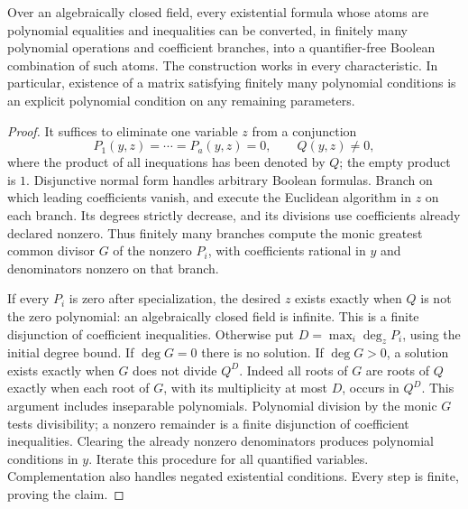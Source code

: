 \begin{lemma}
\label{C:canonical-polynomial-elimination}
Over an algebraically closed field, every existential formula whose atoms
are polynomial equalities and inequalities can be converted, in finitely
many polynomial operations and coefficient branches, into a quantifier-free
Boolean combination of such atoms. The construction works in every
characteristic. In particular, existence of a matrix satisfying finitely
many polynomial conditions is an explicit polynomial condition on any
remaining parameters.
\end{lemma}
\begin{proof}
It suffices to eliminate one variable $z$ from a conjunction
\[
 P_1(y,z)=\cdots=P_a(y,z)=0,\qquad Q(y,z)\ne0,
\]
where the product of all inequations has been denoted by $Q$; the empty
product is $1$. Disjunctive normal form handles arbitrary Boolean formulas.
Branch on which leading coefficients vanish, and execute the Euclidean
algorithm in $z$ on each branch. Its degrees strictly decrease, and its
divisions use coefficients already declared nonzero. Thus finitely many
branches compute the monic greatest common divisor $G$ of the nonzero
$P_i$, with coefficients rational in $y$ and denominators nonzero on that
branch.

If every $P_i$ is zero after specialization, the desired $z$ exists exactly
when $Q$ is not the zero polynomial: an algebraically closed field is
infinite. This is a finite disjunction of coefficient inequalities. Otherwise
put $D=\max_i\deg_z P_i$, using the initial degree bound. If $\deg G=0$
there is no solution. If $\deg G>0$, a solution exists exactly when
$G$ does not divide $Q^D$. Indeed all roots of $G$ are roots of $Q$ exactly
when each root of $G$, with its multiplicity at most $D$, occurs in $Q^D$.
This argument includes inseparable polynomials. Polynomial division by the
monic $G$ tests divisibility; a nonzero remainder is a finite disjunction
of coefficient inequalities. Clearing the already nonzero denominators
produces polynomial conditions in $y$. Iterate this procedure for all
quantified variables. Complementation also handles negated existential
conditions. Every step is finite, proving the claim.
\end{proof}

